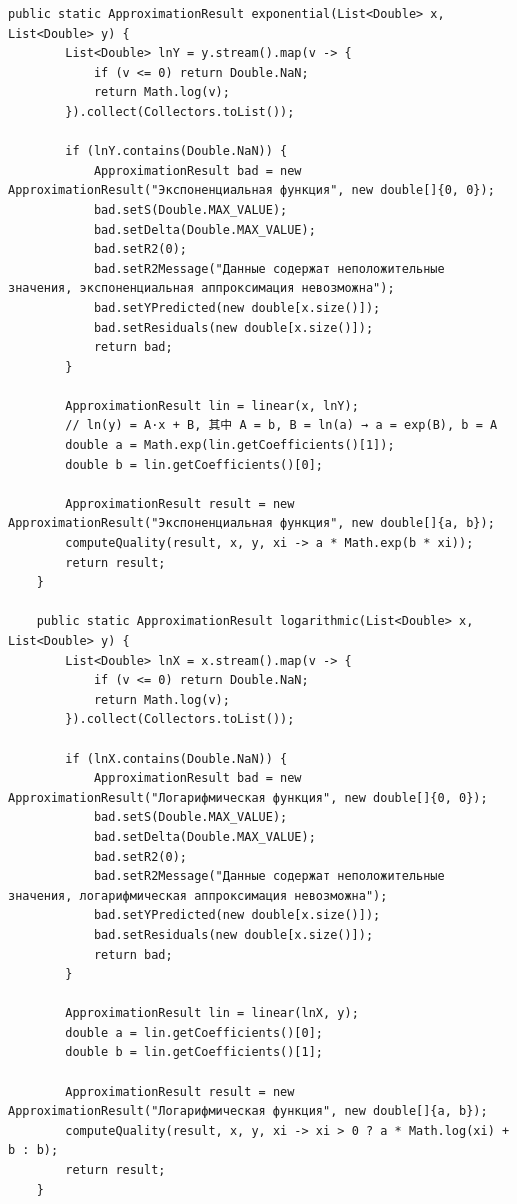 \begin{lstlisting}[style=javaStyle, label=code:lsm]
    public static ApproximationResult exponential(List<Double> x, List<Double> y) {
        List<Double> lnY = y.stream().map(v -> {
            if (v <= 0) return Double.NaN;
            return Math.log(v);
        }).collect(Collectors.toList());

        if (lnY.contains(Double.NaN)) {
            ApproximationResult bad = new ApproximationResult("Экспоненциальная функция", new double[]{0, 0});
            bad.setS(Double.MAX_VALUE);
            bad.setDelta(Double.MAX_VALUE);
            bad.setR2(0);
            bad.setR2Message("Данные содержат неположительные значения, экспоненциальная аппроксимация невозможна");
            bad.setYPredicted(new double[x.size()]);
            bad.setResiduals(new double[x.size()]);
            return bad;
        }

        ApproximationResult lin = linear(x, lnY);
        // ln(y) = A·x + B, 其中 A = b, B = ln(a) → a = exp(B), b = A
        double a = Math.exp(lin.getCoefficients()[1]);
        double b = lin.getCoefficients()[0];

        ApproximationResult result = new ApproximationResult("Экспоненциальная функция", new double[]{a, b});
        computeQuality(result, x, y, xi -> a * Math.exp(b * xi));
        return result;
    }

    public static ApproximationResult logarithmic(List<Double> x, List<Double> y) {
        List<Double> lnX = x.stream().map(v -> {
            if (v <= 0) return Double.NaN;
            return Math.log(v);
        }).collect(Collectors.toList());

        if (lnX.contains(Double.NaN)) {
            ApproximationResult bad = new ApproximationResult("Логарифмическая функция", new double[]{0, 0});
            bad.setS(Double.MAX_VALUE);
            bad.setDelta(Double.MAX_VALUE);
            bad.setR2(0);
            bad.setR2Message("Данные содержат неположительные значения, логарифмическая аппроксимация невозможна");
            bad.setYPredicted(new double[x.size()]);
            bad.setResiduals(new double[x.size()]);
            return bad;
        }

        ApproximationResult lin = linear(lnX, y);
        double a = lin.getCoefficients()[0];
        double b = lin.getCoefficients()[1];

        ApproximationResult result = new ApproximationResult("Логарифмическая функция", new double[]{a, b});
        computeQuality(result, x, y, xi -> xi > 0 ? a * Math.log(xi) + b : b);
        return result;
    }


\end{lstlisting}
